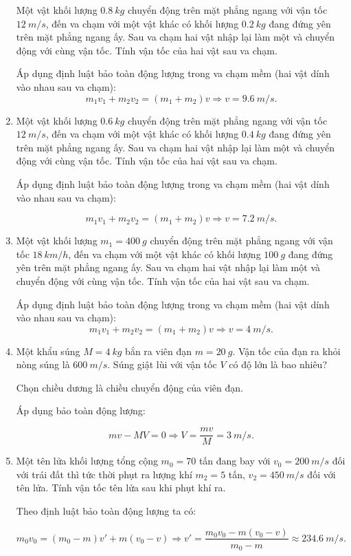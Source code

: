 \begin{enumerate}[label=\bfseries Câu \arabic*:]
	
	{
		Một vật khối lượng $\SI{0.8}{kg}$ chuyển động trên mặt phẳng ngang với vận tốc $\SI{12}{m/s}$, đến va chạm với một vật khác có khối lượng $\SI{0.2}{kg}$ đang đứng yên trên mặt phẳng ngang ấy. Sau va chạm hai vật nhập lại làm một và chuyển động với cùng vận tốc. Tính vận tốc của hai vật sau va chạm.
	}
	
	\hideall
	{	
		Áp dụng định luật bảo toàn động lượng trong va chạm mềm (hai vật dính vào nhau sau va chạm):
		$$m_1v_1 + m_2 v_2 = (m_1 + m_2) v \Rightarrow v=\SI{9.6}{m/s}.$$
	}
	\item {}
	
	
	{
		Một vật khối lượng $\SI{0.6}{kg}$ chuyển động trên mặt phẳng ngang với vận tốc $\SI{12}{m/s}$, đến va chạm với một vật khác có khối lượng $\SI{0.4}{kg}$ đang đứng yên trên mặt phẳng ngang ấy. Sau va chạm hai vật nhập lại làm một và chuyển động với cùng vận tốc. Tính vận tốc của hai vật sau va chạm.
	}
	
	\hideall
	{	
		Áp dụng định luật bảo toàn động lượng trong va chạm mềm (hai vật dính vào nhau sau va chạm):
		
		$$m_1v_1 + m_2 v_2 = (m_1 + m_2) v \Rightarrow v=\SI{7.2}{m/s}.$$
	}
	\item {}
	
	
	{
		Một vật khối lượng $m_1=\SI{400}{g}$ chuyển động trên mặt phẳng ngang với vận tốc $\SI{18}{km/h}$, đến va chạm với một vật khác có khối lượng $\SI{100}{g}$ đang đứng yên trên mặt phẳng ngang ấy. Sau va chạm hai vật nhập lại làm một và chuyển động với cùng vận tốc. Tính vận tốc của hai vật sau va chạm.
	}
	
	\hideall
	{	
		Áp dụng định luật bảo toàn động lượng trong va chạm mềm (hai vật dính vào nhau sau va chạm):
		$$m_1v_1 + m_2 v_2 = (m_1 + m_2) v \Rightarrow v=\SI{4}{m/s}.$$
	}
		\item {}
	
	
	{
	Một khẩu súng $M = \SI{4}{kg}$ bắn ra viên đạn $m = \SI{20}{g}$. Vận tốc của đạn ra khỏi nòng súng là $\SI{600}{m/s}$. Súng giật lùi với vận tốc $V$ có độ lớn là bao nhiêu?
	}
	
	\hideall
	{	
		Chọn chiều dương là chiều chuyển động của viên đạn.
		
		Áp dụng bảo toàn động lượng:
		
		$$mv - MV = 0 \Rightarrow V = \dfrac{mv}{M} = \SI{3}{m/s}.$$
	}
		\item {}
	
	
	{Một tên lửa khối lượng tổng cộng $m_0 = 70$ tấn đang bay với $v_0= \SI{200}{m/s}$ đối với trái đất thì tức thời phụt ra lượng khí $m_2 = 5$ tấn, $v_2 = \SI{450}{m/s}$ đối với tên lửa. Tính vận tốc tên lửa sau khi phụt khí ra.
	}
	
	\hideall
	{	
		Theo định luật bảo toàn động lượng ta có:
		
		$$m_0v_0 = (m_0 -m)v' + m(v_0-v) \Rightarrow v' = \dfrac{m_0v_0 - m(v_0-v)}{m_0-m} \approx \SI{234,6}{m/s}.$$
	}
\end{enumerate}